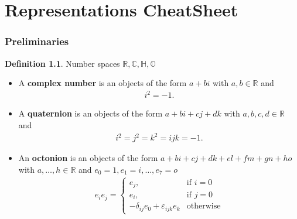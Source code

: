 \documentclass[10pt,a4paper]{book}
\theoremstyle{definition}
\newtheorem{definition}{Definition}[section]
\begin{document}
\newpage
\chapter{Representations CheatSheet}

\subsection{Preliminaries}
\begin{definition}{}
Number spaces $\mathbb{R,C,H,O}$
\begin{itemize}
    \item A {\bf complex number} is an objects of the form $a+bi$ with $a,b\in\mathbb{R}$ and 
    \begin{align}
        i^2=-1.
    \end{align}
    \item A {\bf quaternion} is an objects of the form $a+bi+cj+dk$ with $a,b,c,d\in\mathbb{R}$ and 
    \begin{align}
        i^2=j^2=k^2=ijk=-1.
    \end{align}
    
    \begin{center}
\end{center}
    
    \item An {\bf octonion} is an objects of the form $a+bi+cj+dk+el+fm+gn+ho$ with $a,\dots,h\in\mathbb{R}$ and $e_0=1, e_1=i, \dots, e_7=o$
    \begin{align}
        e_ie_j=\left\{\begin{array}{ll}
                e_j, & \text{if }i=0  \\
                e_i, & \text{if }j=0  \\
                -\delta_{ij}e_0 + \varepsilon_{ijk}e_k & \text{otherwise}
                \end{array}
                \right.
    \end{align}
\end{itemize}
\end{definition}
\end{document}
